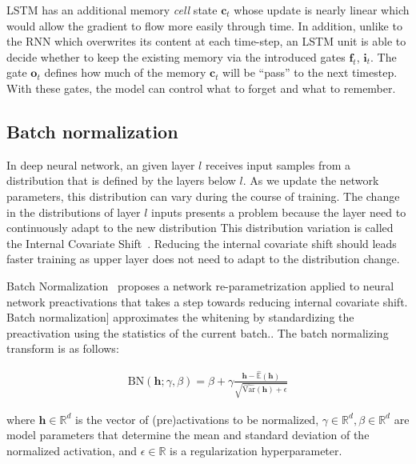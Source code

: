 \documentclass{article} %
\newcommand{\vect}[1]{\mathbf{#1}}
\newcommand{\reals}{\mathbb{R}}
\begin{document}
LSTM has an  additional memory \emph{cell} state $\vect{c}_t$ whose update is nearly linear which would
allow the gradient to flow more easily through time.
In addition, unlike to the RNN which overwrites its content at each time-step,
an LSTM unit is able to decide whether to keep the existing memory via the introduced gates $\vect{f}_t$, $\vect{i}_t$.
The gate $\vect{o}_t$ defines how much of the memory $\vect{c}_t$ will be ``pass'' to the next timestep.
With these gates, the model can control what to forget and what to remember.




\subsection{Batch normalization}

In deep neural network, an given layer $l$ receives input samples from a distribution that is defined by the layers below $l$.
As we update the network parameters, this distribution can vary during the course of training.
The change in the distributions of layer $l$ inputs presents a problem because the layer need to continuously adapt to the new distribution
This distribution variation is called the Internal Covariate Shift~\cite{shimodaira2000improving}.
Reducing the internal covariate shift should leads  faster training as upper layer does not need to adapt to the distribution change.

Batch Normalization~\cite{batchnorm} proposes a network re-parametrization applied to neural network preactivations that takes a step towards reducing
internal covariate shift. Batch normalization] approximates the
whitening by standardizing the preactivation using the statistics of the current batch..
The batch normalizing transform is as follows:

\begin{align}
\mathrm{BN}(\vect{h}; \gamma, \beta) =
  \beta + \gamma
  \frac{\vect{h} -   \widehat{\mathbb{E}}(\vect{h})}
       {       \sqrt{\widehat{\mathrm{Var }}(\vect{h}) + \epsilon}}
\end{align}

where $\vect{h} \in \reals^d$ is the vector of (pre)activations to be normalized, $\gamma \in \reals^d, \beta \in \reals^d$ are model parameters that determine the mean and standard deviation of the normalized activation, and $\epsilon \in \reals$ is a regularization hyperparameter.
\end{document}
